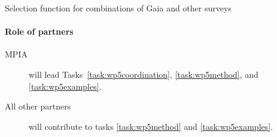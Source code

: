 \begin{workpackage}{Selection function for combinations of Gaia and other surveys}
\begin{wpdescription}
    \paragraph{Role of partners}
    \begin{description}
      \item[MPIA] will lead Tasks~\ref{task:wp5coordination}, \ref{task:wp5method}, and \ref{task:wp5examples}.
      \item[All other partners] will contribute to tasks \ref{task:wp5method} and \ref{task:wp5examples}.
    \end{description}
  \end{wpdescription}

  \begin{wpdeliverables}
    \label{dev:wp5finalreport}
  \end{wpdeliverables}

\end{workpackage}


